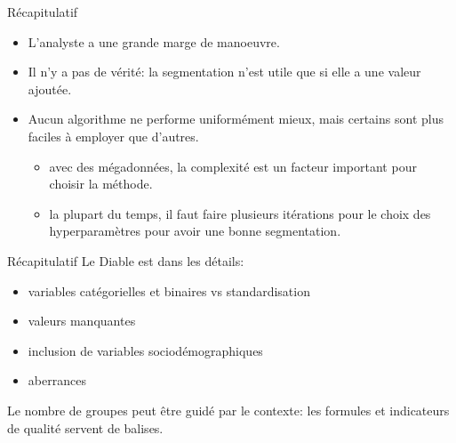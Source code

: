 \documentclass[
  ignorenonframetext,
]{beamer}
\providecommand{\tightlist}{%
  \setlength{\itemsep}{0pt}\setlength{\parskip}{0pt}}\usepackage{longtable,booktabs,array}
\begin{document}
\begin{frame}{Récapitulatif}
\protect\hypertarget{ruxe9capitulatif-1}{}
\begin{itemize}
\tightlist
\item
  L'analyste a une grande marge de manoeuvre.
\item
  Il n'y a pas de vérité: la segmentation n'est utile que si elle a une
  valeur ajoutée.
\item
  Aucun algorithme ne performe uniformément mieux, mais certains sont
  plus faciles à employer que d'autres.

  \begin{itemize}
  \tightlist
  \item
    avec des mégadonnées, la complexité est un facteur important pour
    choisir la méthode.
  \item
    la plupart du temps, il faut faire plusieurs itérations pour le
    choix des hyperparamètres pour avoir une bonne segmentation.
  \end{itemize}
\end{itemize}
\end{frame}

\begin{frame}{Récapitulatif}
\protect\hypertarget{ruxe9capitulatif-2}{}
Le Diable est dans les détails:

\begin{itemize}
\tightlist
\item
  variables catégorielles et binaires vs standardisation
\item
  valeurs manquantes
\item
  inclusion de variables sociodémographiques
\item
  aberrances
\end{itemize}

Le nombre de groupes peut être guidé par le contexte: les formules et
indicateurs de qualité servent de balises.
\end{frame}
\end{document}
